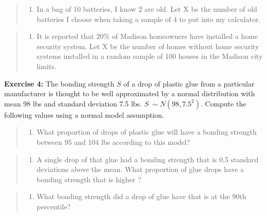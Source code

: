 \documentclass[
]{article}
\providecommand{\tightlist}{%
  \setlength{\itemsep}{0pt}\setlength{\parskip}{0pt}}
\begin{document}
\begin{quote}
\begin{enumerate}
\def\labelenumi{\alph{enumi}.}
\setcounter{enumi}{3}
\tightlist
\item
  In a bag of 10 batteries, I know 2 are old. Let X be the number of old
  batteries I choose when taking a sample of 4 to put into my
  calculator.
\end{enumerate}
\end{quote}

\begin{quote}
\begin{enumerate}
\def\labelenumi{\alph{enumi}.}
\setcounter{enumi}{4}
\tightlist
\item
  It is reported that 20\% of Madison homeowners have installed a home
  security system. Let X be the number of homes without home security
  systems installed in a random sample of 100 houses in the Madison city
  limits.
\end{enumerate}
\end{quote}

\vspace{.5cm}

\textbf{Exercise 4:} The bonding strength \(S\) of a drop of plastic
glue from a particular manufacturer is thought to be well approximated
by a normal distribution with mean 98 lbs and standard deviation 7.5
lbs. \(S~\sim N(98, 7.5^2)\). Compute the following values using a
normal model assumption.

\begin{quote}
\begin{enumerate}
\def\labelenumi{\alph{enumi}.}
\tightlist
\item
  What proportion of drops of plastic glue will have a bonding strength
  between 95 and 104 lbs according to this model?
\end{enumerate}
\end{quote}

\begin{quote}
\begin{enumerate}
\def\labelenumi{\alph{enumi}.}
\setcounter{enumi}{1}
\tightlist
\item
  A single drop of that glue had a bonding strength that is 0.5 standard
  deviations above the mean. What proportion of glue drops have a
  bonding strength that is higher ?
\end{enumerate}
\end{quote}

\begin{quote}
\begin{enumerate}
\def\labelenumi{\alph{enumi}.}
\setcounter{enumi}{2}
\tightlist
\item
  What bonding strength did a drop of glue have that is at the 90th
  percentile?
\end{enumerate}
\end{quote}
\end{document}
